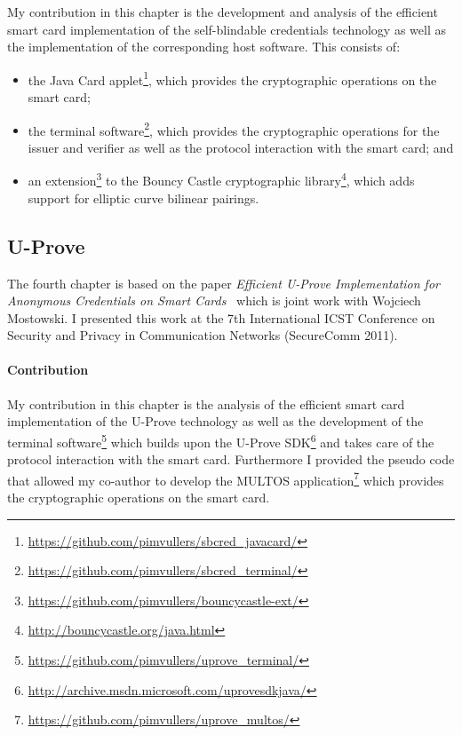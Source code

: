 My contribution in this chapter is the development and analysis of the efficient
smart card implementation of the self-blindable credentials technology as well
as the implementation of the corresponding host software. This consists of:
\begin{itemize}
  \item the Java Card applet\footnote{\url{https://github.com/pimvullers/sbcred_javacard/}},
    which provides the cryptographic operations on the smart card;
  \item the terminal software\footnote{\url{https://github.com/pimvullers/sbcred_terminal/}},
    which provides the cryptographic operations for the issuer and verifier as
    well as the protocol interaction with the smart card; and
  \item an extension\footnote{\url{https://github.com/pimvullers/bouncycastle-ext/}}
    to the Bouncy Castle cryptographic library\footnote{\url{http://bouncycastle.org/java.html}},
    which adds support for elliptic curve bilinear pairings.
\end{itemize}

\subsection{U-Prove}

The fourth chapter is based on the paper \emph{Efficient U-Prove Implementation
for Anonymous Credentials on Smart Cards}~\cite{MostowskiVullers11} which is
joint work with Wojciech Mostowski. I presented this work at the 7th
International ICST Conference on Security and Privacy in Communication Networks
(SecureComm 2011).

\paragraph{Contribution}

My contribution in this chapter is the analysis of the efficient smart card
implementation of the U-Prove technology as well as the development of the
terminal software\footnote{\url{https://github.com/pimvullers/uprove_terminal/}}
which builds upon the U-Prove SDK\footnote{\url{http://archive.msdn.microsoft.com/uprovesdkjava/}}
and takes care of the protocol interaction with the smart card. Furthermore I
provided the pseudo code that allowed my co-author to develop the MULTOS
application\footnote{\url{https://github.com/pimvullers/uprove_multos/}} which
provides the cryptographic operations on the smart card.

